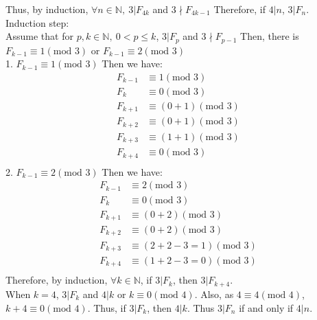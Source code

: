 \documentclass{article}
\begin{document}
Thus, by induction, \(\forall n \in \mathbb{N},\ 3|F_{4k}\) and \(3\nmid F_{4k-1}\) Therefore, if \(4|n\), \(3|F_n\).\\
Induction step:\\
Assume that for \(p,k\in \mathbb {N},\ 0<p\leqslant k\), \(3|F_{p}\) and \(3\nmid F_{p-1}\)
Then, there is \(F_{k-1}\equiv1(\text{mod }3)\) or \(F_{k-1}\equiv2(\text{mod }3)\)\\
1. \(F_{k-1}\equiv 1 (\text{mod }3)\)
    Then we have:
    \begin{align*}
        F_{k-1} &\equiv 1 (\text{mod }3)\\
        F_{k} &\equiv 0 (\text{mod }3)\\
        F_{k+1} &\equiv (0+1) (\text{mod }3)\\
        F_{k+2} &\equiv (0+1) (\text{mod }3)\\
        F_{k+3} &\equiv (1+1) (\text{mod }3)\\
        F_{k+4}&\equiv 0 (\text{mod }3)\\
    \end{align*}
2. \(F_{k-1}\equiv 2 (\text{mod }3)\)
    Then we have:
    \begin{align*}
        F_{k-1} &\equiv 2 (\text{mod }3)\\
        F_{k} &\equiv 0 (\text{mod }3)\\
        F_{k+1} &\equiv (0+2) (\text{mod }3)\\
        F_{k+2} &\equiv (0+2) (\text{mod }3)\\
        F_{k+3} &\equiv (2+2-3=1) (\text{mod }3)\\
        F_{k+4}&\equiv (1+2-3=0) (\text{mod }3)\\
    \end{align*}
Therefore, by induction, \(\forall k\in\mathbb{N}\), if \(3|F_k\), then \(3|F_{k+4}\).\\
When \(k=4\), \(3|F_k\) and \(4|k\) or \(k\equiv0(\text{mod }4) \). Also, as \(4\equiv4(\text{mod } 4)\),  \\ \(k+4\equiv0(\text{mod }4)\).
Thus, if \(3|F_k\), then \(4|k\). Thus \(3|F_n\) if and only if \(4|n\). 
\newpage
\end{document}
